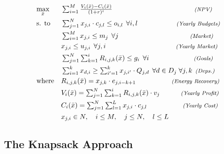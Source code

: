     \begin{equation}
    \label{eq:pmmlpo++}
      \mymathstyle
      \begin{aligned}
	 & \underset{\bar{x}}{\text{max}}       & & \mymathstyle \sum_{i=1}^{M} \frac{V_i(\bar{x}) - C_i(\bar{x})}{(1 + r)^i}	\hspace{27.5ex} \textit{\scriptsize (NPV)} \\
	 & \text{s. to} 			& & \mymathstyle \sum_{j=1}^{N} x_{j, i} \cdot c_{j,l} \le o_{i,l} \, \; \forall i, l \hspace{13ex} \textit{\scriptsize (Yearly Budgets)} \\
	 & 					& & \mymathstyle \sum_{i=1}^{M} x_{j, i} \le m_j \, \; \forall j 			\hspace{24ex} \textit{\scriptsize (Market)} \\
	 & 					& & \mymathstyle x_{j, i} \le u_{j, i} \, \; \forall j, i 			\hspace{23.5ex} \textit{\scriptsize (Yearly Market)} \\
	 & 					& & \mymathstyle \sum_{j=1}^{N} \sum_{k=1}^{i}R_{i,j,k}(\bar{x}) \leq g_i \, \; \forall i    \hspace{15ex}  \textit{\scriptsize (Goals)} \\
	 & 					& & \mymathstyle \sum_{i=1}^{k} x_{d, i} \ge \sum_{i'=1}^{k} x_{j, i'} \cdot Q_{j, d} \, \; \forall d \in D_j\;  \forall j,k  \hspace{1ex} \textit{\scriptsize (Deps.)}\\
	 & \text{where}				& & \mymathstyle  R_{i,j,k}(\bar{x}) = x_{j, k} \cdot e_{j, i - k + 1} 	\hspace{12ex}  \textit{\scriptsize (Energy Recovery)}\\
	 & 					& & \mymathstyle V_{i}(\bar{x}) = \sum_{j=1}^{N} \sum_{k=1}^{i} R_{i, j, k}(\bar{x}) \cdot v_j   \hspace{7ex}  \textit{\scriptsize (Yearly Profit)}\\
	 & 					& & \mymathstyle C_{i}(\bar{x}) = \sum_{j=1}^{N} \sum_{l=1}^{L} x_{j, i} \cdot c_{j,l}   \hspace{12ex} \textit{\scriptsize (Yearly Cost)}\\
	 & 					& & \mymathstyle x_{j,i} \in N, \quad i \le M, \quad j \le N, \quad l \le L
      \end{aligned}
    \end{equation}

\subsection{The Knapsack Approach}
\label{sec:model:knap}

